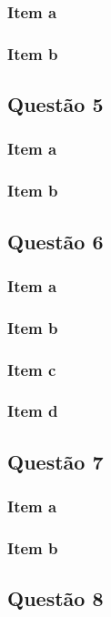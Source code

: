 \documentclass[a4paper, 12pt]{article}
\begin{document}
    \subsubsection{Item a} 
    \subsubsection{Item b}     
    \subsection{Quest\~{a}o 5}
    \subsubsection{Item a} 
    \subsubsection{Item b}     
    \subsection{Quest\~{a}o 6}
    \subsubsection{Item a} 
    \subsubsection{Item b} 
    \subsubsection{Item c} 
	\subsubsection{Item d}     
    \subsection{Quest\~{a}o 7}
    \subsubsection{Item a} 
    \subsubsection{Item b}     
    \subsection{Quest\~{a}o 8}    
                            
\end{document}

